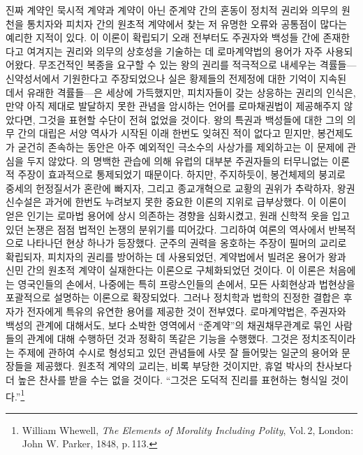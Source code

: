 진짜 계약인 묵시적 계약과 계약이 아닌 준계약 간의 혼동이
정치적 권리와 의무의 원천을
통치자와 피치자 간의 원초적 계약에서
찾는
저 유명한 오류와 공통점이 많다는 예리한 지적이 있다.
이 이론이 확립되기 오래 전부터도
주권자와 백성들 간에 존재한다고 여겨지는
권리와 의무의 상호성을 기술하는 데
로마계약법의 용어가 자주 사용되어왔다.
무조건적인 복종을 요구할 수 있는 왕의 권리를 적극적으로 내세우는
격률들---신약성서에서 기원한다고 주장되었으나 실은
황제들의 전제정에 대한 기억이 지속된 데서 유래한 격률들---은
세상에 가득했지만,
피치자들이 갖는 상응하는 권리의 인식은,
만약
아직 제대로 발달하지 못한 관념을 암시하는 언어를
로마채권법이
제공해주지 않았다면,
그것을 표현할 수단이 전혀 없었을 것이다.
왕의 특권과 백성들에 대한 그의 의무 간의 대립은
서양 역사가 시작된 이래 한번도 잊혀진 적이 없다고 믿지만,
봉건제도가 굳건히 존속하는 동안은
아주 예외적인 극소수의 사상가를 제외하고는
이 문제에 관심을 두지 않았다.
의 명백한 관습에 의해
유럽의 대부분 주권자들의 터무니없는 이론적 주장이
효과적으로 통제되었기 때문이다.
하지만,
주지하듯이,
봉건체제의 붕괴로 중세의 헌정질서가 혼란에 빠지자,
그리고
종교개혁으로 교황의 권위가 추락하자,
왕권신수설은
과거에 한번도 누려보지 못한
중요한 이론의 지위로
급부상했다.
이 이론이 얻은 인기는
로마법 용어에 상시 의존하는 경향을 심화시켰고,
원래 신학적 옷을 입고 있던 논쟁은
점점
법적인 논쟁의 분위기를 띠어갔다.
그리하여 여론의 역사에서 반복적으로 나타나던 현상 하나가 등장했다.
군주의 권력을 옹호하는 주장이 필머의 교리로
확립되자,
피치자의 권리를 방어하는 데 사용되었던,
계약법에서 빌려온
용어가
왕과 신민 간의 원초적 계약이 실재한다는 이론으로
구체화되었던 것이다.
이 이론은 처음에는 영국인들의 손에서,
나중에는 특히 프랑스인들의 손에서,
모든 사회현상과 법현상을 포괄적으로 설명하는 이론으로 확장되었다.
그러나
정치학과 법학의 진정한 결합은
후자가 전자에게
특유의 유연한 용어를 제공한 것이 전부였다.
로마계약법은,
주권자와 백성의 관계에 대해서도,
보다 소박한 영역에서
``준계약''의 채권채무관계로 묶인 사람들의 관계에 대해 수행하던 것과
정확히 똑같은 기능을 수행했다.
그것은
정치조직이라는 주제에 관하여 수시로 형성되고 있던 관념들에
사뭇 잘 들어맞는
일군의 용어와 문장들을 제공했다.
원초적 계약의 교리는,
비록 부당한 것이지만,
휴얼 박사의
찬사보다 더 높은 찬사를 받을 수는 없을 것이다.
``그것은 도덕적 진리를 표현하는  형식일 것이다.''\footnote{%
  \latinmarks
  William Whewell,
  \textit{The Elements of Morality Including Polity},
  Vol.\,2,
  London: John W. Parker, 1848,
  p.\,113.
  }

